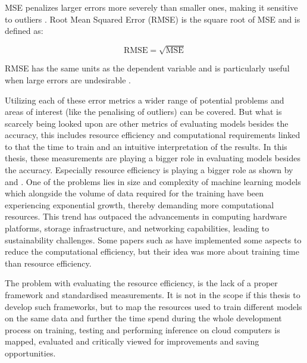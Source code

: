 \documentclass{article}
\begin{document}
MSE penalizes larger errors more severely than smaller ones, making it sensitive to outliers \cite{MSE}.
Root Mean Squared Error (RMSE) is the square root of MSE and is defined as:

\begin{equation}
\text{RMSE} = \sqrt{\text{MSE}}
\end{equation}

RMSE has the same units as the dependent variable and is particularly useful when large errors are undesirable \cite{MAE_RMSE}.\par 

Utilizing each of these error metrics a wider range of potential problems and areas of interest (like the penalising of outliers) can be covered. But what is scarcely being looked upon are other metrics of evaluating models besides the accuracy, this includes resource efficiency and computational requirements linked to that the time to train and an intuitive interpretation of the results. In this thesis, these measurements are playing a bigger role in evaluating models besides the accuracy. Especially resource efficiency is playing a bigger role as shown by \cite{AI_energy_consumption} and \cite{resource_awareness}. One of the problems lies in size and complexity of machine learning models which alongside the volume of data required for the training have been experiencing exponential growth, thereby demanding more computational resources. This trend has outpaced the advancements in computing hardware platforms, storage infrastructure, and networking capabilities, leading to sustainability challenges. Some papers such as \cite{Informer} have implemented some aspects to reduce the computational efficiency, but their idea was more about training time than resource efficiency. \par 
The problem with evaluating the resource efficiency, is the lack of a proper framework and standardised measurements. It is not in the scope if this thesis to develop such frameworks, but to map the resources used to train different models on the same data and further the time spend during the whole development process on training, testing and performing inference on cloud computers is mapped, evaluated and critically viewed for improvements and saving opportunities.
\end{document}
